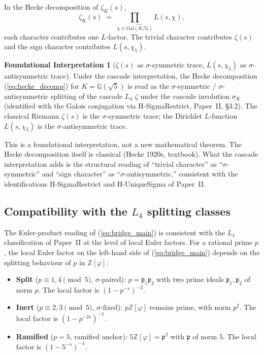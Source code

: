 \documentclass[11pt,a4paper]{article}
\theoremstyle{definition}
\newtheorem{interpretation}[theorem]{Foundational Interpretation}
\theoremstyle{remark}
\begin{document}
In the Hecke decomposition of $\zeta_K(s)$,
\begin{equation}\label{eq:hecke_decomp}
  \zeta_K(s) \;=\; \prod_{\chi \in \widehat{\mathrm{Gal}(K/\mathbb{Q})}}
    L(s, \chi),
\end{equation}
each character contributes one $L$-factor. The trivial character
contributes $\zeta(s)$ and the sign character contributes
$L(s, \chi_5)$.

\begin{interpretation}[$\zeta(s)$ as $\sigma$-symmetric trace, $L(s, \chi_5)$ as $\sigma$-antisymmetric trace]\label{interp:sigma_decomp}
Under the cascade interpretation, the Hecke decomposition
(\ref{eq:hecke_decomp}) for $K = \mathbb{Q}(\sqrt{5})$ is read as the
$\sigma$-symmetric / $\sigma$-antisymmetric splitting of the cascade
$L_4$ $\zeta$ under the cascade involution $\sigma_K$ (identified with
the Galois conjugation via H-SigmaRestrict, Paper~II, \S 3.2). The
classical Riemann $\zeta(s)$ is the $\sigma$-symmetric trace; the
Dirichlet $L$-function $L(s, \chi_5)$ is the $\sigma$-antisymmetric
trace.

\smallskip\noindent
This is a foundational interpretation, not a new mathematical theorem.
The Hecke decomposition itself is classical (Hecke 1920s, textbook).
What the cascade interpretation adds is the structural reading of
``trivial character'' as ``$\sigma$-symmetric'' and ``sign character''
as ``$\sigma$-antisymmetric,'' consistent with the identifications
H-SigmaRestrict and H-UniqueSigma of Paper~II.
\end{interpretation}

\subsection{Compatibility with the $L_4$ splitting classes}

The Euler-product reading of (\ref{eq:bridge_main}) is consistent with
the $L_4$ classification of Paper~II at the level of local Euler
factors. For a rational prime $p$, the local Euler factor on the
left-hand side of (\ref{eq:bridge_main}) depends on the splitting
behaviour of $p$ in $\mathbb{Z}[\varphi]$:

\begin{itemize}
\item \textbf{Split} ($p \equiv 1, 4 \pmod 5$, $\sigma$-paired):
      $p = \mathfrak{p}_1 \mathfrak{p}_2$ with two prime ideals
      $\mathfrak{p}_1, \mathfrak{p}_2$ of norm $p$. The local factor is
      $(1 - p^{-s})^{-2}$.
\item \textbf{Inert} ($p \equiv 2, 3 \pmod 5$, $\sigma$-fixed):
      $p\mathbb{Z}[\varphi]$ remains prime, with norm $p^2$. The local
      factor is $(1 - p^{-2s})^{-1}$.
\item \textbf{Ramified} ($p = 5$, ramified anchor):
      $5\mathbb{Z}[\varphi] = \mathfrak{p}^2$ with $\mathfrak{p}$ of
      norm $5$. The local factor is $(1 - 5^{-s})^{-1}$.
\end{itemize}
\end{document}
